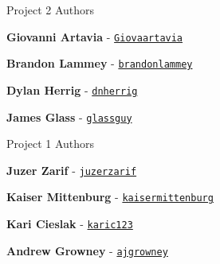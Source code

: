 Project 2 Authors
\begin{DoxyItemize}
\item {\bfseries Giovanni Artavia} -\/ \href{https://github.com/Giovaartavia}{\tt Giovaartavia}
\item {\bfseries Brandon Lammey} -\/ \href{https://github.com/brandonlammey}{\tt brandonlammey}
\item {\bfseries Dylan Herrig} -\/ \href{https://github.com/dnherrig}{\tt dnherrig}
\item {\bfseries James Glass} -\/ \href{https://github.com/glassguy}{\tt glassguy}
\end{DoxyItemize}

Project 1 Authors
\begin{DoxyItemize}
\item {\bfseries Juzer Zarif} -\/ \href{https://github.com/juzerzarif}{\tt juzerzarif}
\item {\bfseries Kaiser Mittenburg} -\/ \href{https://github.com/kaisermittenburg}{\tt kaisermittenburg}
\item {\bfseries Kari Cieslak} -\/ \href{https://github.com/karic123}{\tt karic123}
\item {\bfseries Andrew Growney} -\/ \href{https://github.com/ajgrowney}{\tt ajgrowney} 
\end{DoxyItemize}